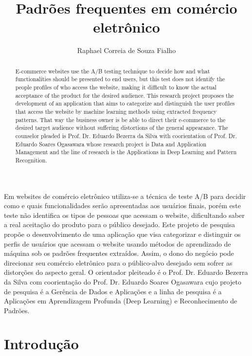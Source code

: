 \documentclass[12pt]{article}
\title{Padrões frequentes em comércio eletrônico}
\author{Raphael Correia de Souza Fialho\inst{1}}
\begin{document}
 

\maketitle

\begin{abstract}
   E-commerce websites use the A/B testing technique to decide how and what functionalities should be presented to end users, but this test does not identify the people profiles of who access the website, making it difficult to know the actual acceptance of the product for the desired audience.
   This research project proposes the development of an application that aims to categorize and distinguish the user profiles that access the website by machine learning methods using extracted frequency patterns. That way the business owner is be able to direct their e-commerce to the desired target audience without suffering distortions of the general appearance. The counselor pleaded is Prof. Dr. Eduardo Bezerra da Silva with coorientation of Prof. Dr. Eduardo Soares Ogasawara whose research project is Data and Application Management and the line of research is the Applications in Deep Learning and Pattern Recognition.
\end{abstract}
     
\begin{resumo} 
  Em websites de comércio eletrônico utiliza-se a técnica de teste A/B para decidir como e quais funcionalidades serão apresentadas aos usuários finais, porém este teste não identifica os tipos de pessoas que acessam o website, dificultando saber a real aceitação do produto para o público desejado.
  Este projeto de pesquisa propõe o desenvolvimento de uma aplicação que visa categorizar e distinguir os perfis de usuários que acessam o website usando métodos de aprendizado de máquina sob os padrões frequentes extraídos. Assim, o dono do negócio pode direcionar seu comércio eletrônico para o público-alvo desejado sem sofrer as distorções do aspecto geral. O orientador pleiteado é o Prof. Dr. Eduardo Bezerra da Silva com coorientação do Prof. Dr. Eduardo Soares Ogasawara cujo projeto de pesquisa é a Gerência de Dados e Aplicações e a linha de pesquisa é a Aplicações em Aprendizagem Profunda (Deep Learning) e Reconhecimento de Padrões.
\end{resumo}


\section{Introdução}
\end{document}
